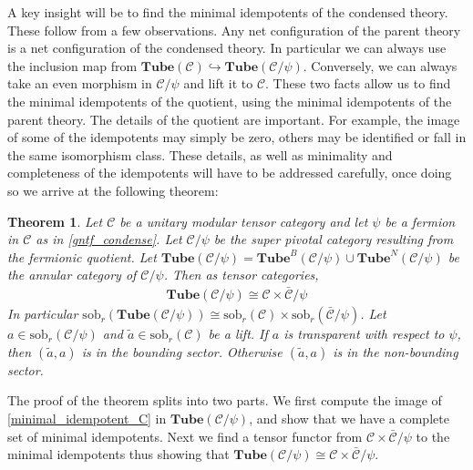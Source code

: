 \documentclass[12pt,a4paper]{article}
\newtheorem{theorem}{Theorem}[subsection]
\newcounter{arrow}
\newcommand{\mcc}{\mathcal{C}}
\newcommand{\tube}{\textbf{Tube}}
\newcommand{\sob}{\text{sob}_r}
\begin{document}
A key insight will be to find the minimal idempotents of the condensed theory.
These follow from a few observations. 
Any net configuration of the parent theory is a net configuration of the condensed theory. 
In particular we can always use the inclusion map from $\tube(\mcc) \hookrightarrow \tube(\mcc/\psi)$.
Conversely, we can always take an even morphism in $\mcc/\psi$ and lift it to $\mcc$.
These two facts allow us to find the minimal idempotents of the quotient, 
using the minimal idempotents of the parent theory.
The details of the quotient are important.
For example, the image of some of the idempotents may simply be zero, 
others may be identified or fall in the same isomorphism class. 
These details, as well as minimality and completeness of the idempotents will have to be addressed carefully,
once doing so we arrive at the following theorem:

\begin{theorem}
Let ${\mcc}$ be a unitary modular tensor category and let $\psi$ be a fermion in ${\mcc}$ as in \ref{gntf_condense}.
Let $\mcc/\psi$ be the super pivotal category resulting from the fermionic quotient.
Let
$
\tube(\mcc/\psi) = \tube^B(\mcc/\psi) \cup \tube^N(\mcc/\psi)
$
be the annular category of $\mcc/\psi$. 
Then as tensor categories,
\begin{align}
\tube(\mcc/\psi) \cong \mcc \times \bar{\mcc}/\psi
\end{align}
In particular $\sob(\tube(\mcc/\psi)) \cong \sob({\mcc}) \times \sob(\bar{\mcc}/\psi)$. 
Let $a \in \sob(\mcc/\psi)$ and $\tilde{a} \in \sob({\mcc})$ be a lift.
If ${a}$ is transparent with respect to $\psi$, then $(\tilde{a},a)$ is in the bounding sector.
Otherwise $(\tilde{a},a)$ is in the non-bounding sector.
\end{theorem}

The proof of the theorem splits into two parts. 
We first compute the image of \eqref{minimal_idempotent_C} in $\tube(\mcc/\psi)$, 
and show that we have a complete set of minimal idempotents.
Next we find a tensor functor from $\mcc \times \bar{\mcc}/\psi $ to the minimal idempotents thus showing that $\tube(\mcc/\psi) \cong \mcc \times \bar{\mcc}/\psi$.
\end{document}
